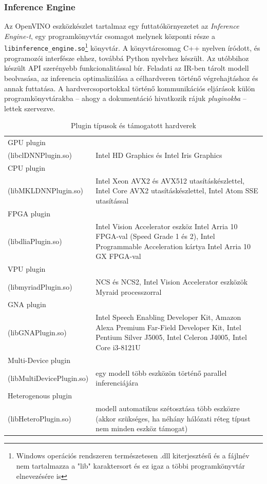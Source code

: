 \subsubsection{Inference Engine}
Az OpenVINO eszközkészlet tartalmaz egy futtatókörnyezetet az \emph{Inference Engine-t}, egy programkönyvtár csomagot melynek központi része a \verb|libinference_engine.so|\footnote{Windows operációs rendszeren természetesen .dll kiterjesztésű és a fájlnév nem tartalmazza a "lib" karaktersort és ez igaz a többi programkönyvtár elnevezésére is} könyvtár. A könyvtárcsomag C++ nyelven íródott, és programozói interfésze ehhez, továbbá Python nyelvhez készült. Az utóbbihoz készült API szerényebb funkcionalitással bír. Feladati az IR-ben tárolt modell beolvasása, az inferencia optimalizálása a célhardveren történő végrehajtáshoz  és annak futtatása. A hardvercsoportokkal történő kommunikációs eljárások külön programkönyvtárakba -- ahogy a dokumentáció hivatkozik rájuk \emph{pluginokba} -- lettek szervezve.
\begin{table}[h]
	\centering
	\begin{tabular}{ p{} | p{} }
		GPU plugin\\(libclDNNPlugin.so) & Intel HD Graphics és Intel Iris Graphics  \\ \hline
		CPU plugin\\(libMKLDNNPlugin.so) & Intel Xeon AVX2 és AVX512 utasításkészlettel, Intel Core AVX2 utasításkészlettel, Intel Atom SSE utasítással \\ \hline
		FPGA plugin\\(libdliaPlugin.so) & Intel Vision Accelerator %
		eszköz Intel Arria 10 FPGA-val (Speed Grade 1 és 2), Intel Programmable Acceleration kártya Intel Arria 10 GX FPGA-val \\ \hline
		VPU plugin\\(libmyriadPlugin.so) & NCS és NCS2, Intel Vision Accelerator %
		eszközök Myraid processzorral\\ \hline
		GNA plugin\\(libGNAPlugin.so) & Intel Speech Enabling Developer Kit, Amazon Alexa Premium Far-Field Developer Kit, Intel Pentium Silver J5005, Intel Celeron J4005, Intel Core i3-8121U \\ \hline
		Multi-Device plugin\\(libMultiDevicePlugin.so) & egy modell több eszközön történő parallel inferenciájára\\ \hline
		Heterogenous plugin\\(libHeteroPlugin.so) & modell automatikus szétosztása több eszközre (akkor szükséges, ha néhány hálózati réteg típust nem minden eszköz támogat)
	\end{tabular}
	\caption{Plugin típusok és támogatott hardverek}
	\label{table:IEplugins}
\end{table}

